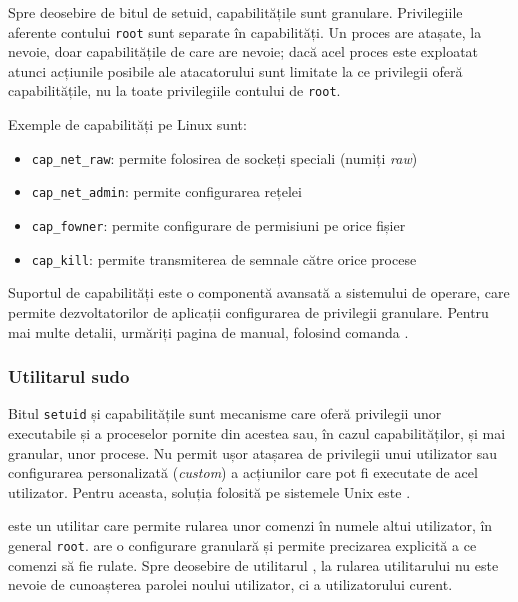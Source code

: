 Spre deosebire de bitul de setuid, capabilitățile sunt granulare.
Privilegiile aferente contului \texttt{root} sunt separate în capabilități.
Un proces are atașate, la nevoie, doar capabilitățile de care are nevoie;
dacă acel proces este exploatat atunci acțiunile posibile ale atacatorului sunt limitate la ce privilegii oferă capabilitățile, nu la toate privilegiile contului de \texttt{root}.

Exemple de capabilități pe Linux sunt:

\begin{itemize}
  \item \texttt{cap\_net\_raw}: permite folosirea de sockeți speciali (numiți \textit{raw})
  \item \texttt{cap\_net\_admin}: permite configurarea rețelei
  \item \texttt{cap\_fowner}: permite configurare de permisiuni pe orice fișier
  \item \texttt{cap\_kill}: permite transmiterea de semnale către orice procese
\end{itemize}

\begin{note}
  Suportul de capabilități este o componentă avansată a sistemului de operare, care permite dezvoltatorilor de aplicații configurarea de privilegii granulare.
  Pentru mai multe detalii, urmăriți pagina de manual, folosind comanda .
\end{note}

\subsubsection{Utilitarul sudo}
\label{sec:user:sudo}

Bitul \texttt{setuid} și capabilitățile sunt mecanisme care oferă privilegii unor executabile și a proceselor pornite din acestea sau, în cazul capabilităților, și mai granular, unor procese.
Nu permit ușor atașarea de privilegii unui utilizator sau configurarea personalizată (\textit{custom}) a acțiunilor care pot fi executate de acel utilizator.
Pentru aceasta, soluția folosită pe sistemele Unix este .

 este un utilitar care permite rularea unor comenzi în numele altui utilizator, în general \texttt{root}.
 are o configurare granulară și permite precizarea explicită a ce comenzi să fie rulate.
Spre deosebire de utilitarul , la rularea utilitarului  nu este nevoie de cunoașterea parolei noului utilizator, ci a utilizatorului curent.

